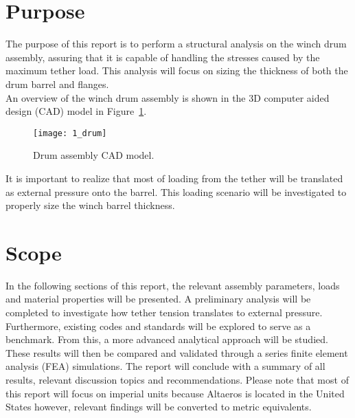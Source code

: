 \section{Purpose}

The purpose of this report is to perform a structural analysis on the winch drum assembly, assuring that it is capable of handling the stresses caused by the maximum tether load. This analysis will focus on sizing the thickness of both the drum barrel and flanges.\\

An overview of the winch drum assembly is shown in the 3D computer aided design (CAD) model \cite{INVENTOR} in Figure~\ref{fig:1_drum}.
\begin{figure}[H]
	\centering
	\texttt{[image: 1\_drum]}
	\caption{Drum assembly CAD model.}
	\label{fig:1_drum}
\end{figure}

It is important to realize that most of loading from the tether will be translated as external pressure onto the barrel. This loading scenario will be investigated to properly size the winch barrel thickness.

\section{Scope}

In the following sections of this report, the relevant assembly parameters, loads and material properties will be presented. A preliminary analysis will be completed to investigate how tether tension translates to external pressure. Furthermore, existing codes and standards will be explored to serve as a benchmark. From this, a more advanced analytical approach will be studied. These results will then be compared and validated through a series finite element analysis (FEA) simulations. The report will conclude with a summary of all results, relevant discussion topics and recommendations. Please note that most of this report will focus on imperial units because Altaeros is located in the United States however, relevant findings will be converted to metric equivalents.